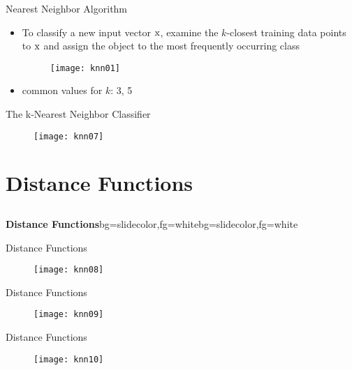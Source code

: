 \begin{frame}{Nearest Neighbor Algorithm}
\begin{itemize}
\item To classify a new input vector ${\rm x}$, examine the $k$-closest training data points to ${\rm x}$ and assign the object to the most frequently occurring class
\begin{figure}
\texttt{[image: knn01]}
\end{figure}
\item common values for $k$: 3, 5
\end{itemize}
\end{frame}

\begin{frame}{The k-Nearest Neighbor Classifier}
\begin{figure}
\texttt{[image: knn07]}
\end{figure}
\end{frame}

\section{Distance Functions}
\subsection{}

\begin{frame}{}
\begin{variableblock}{\centering \Large \textbf{\vspace{4pt}\newline Distance Functions\vspace{4pt}}}{bg=slidecolor,fg=white}{bg=slidecolor,fg=white}
\end{variableblock}
\end{frame}

\begin{frame}{Distance Functions}
\begin{figure}
\texttt{[image: knn08]}
\end{figure}
\end{frame}

\begin{frame}{Distance Functions}
\begin{figure}
\texttt{[image: knn09]}
\end{figure}
\end{frame}

\begin{frame}{Distance Functions}
\begin{figure}
\texttt{[image: knn10]}
\end{figure}
\end{frame}

